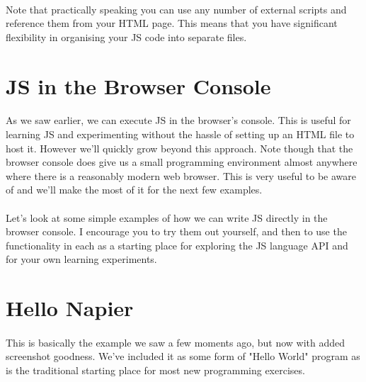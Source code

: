 \paragraph{} Note that practically speaking you can use any number of external scripts and reference them from your HTML page. This means that you have significant flexibility in organising your JS code into separate files.



\section{JS in the Browser Console}
\paragraph{} As we saw earlier, we can execute JS in the browser's console. This is useful for learning JS and experimenting without the hassle of setting up an HTML file to host it. However we’ll quickly grow beyond this approach. Note though that the browser console does give us a small programming environment almost anywhere where there is a reasonably modern web browser. This is very useful to be aware of and we'll make the most of it for the next few examples.
\paragraph{} Let's look at some simple examples of how we can write JS directly in the browser console. I encourage you to try them out yourself, and then to use the functionality in each as a starting place for exploring the JS language API and for your own learning experiments.


\section{Hello Napier}
\paragraph{} This is basically the example we saw a few moments ago, but now with added screenshot goodness. We've included it as some form of "Hello World" program as is the traditional starting place for most new programming exercises.

